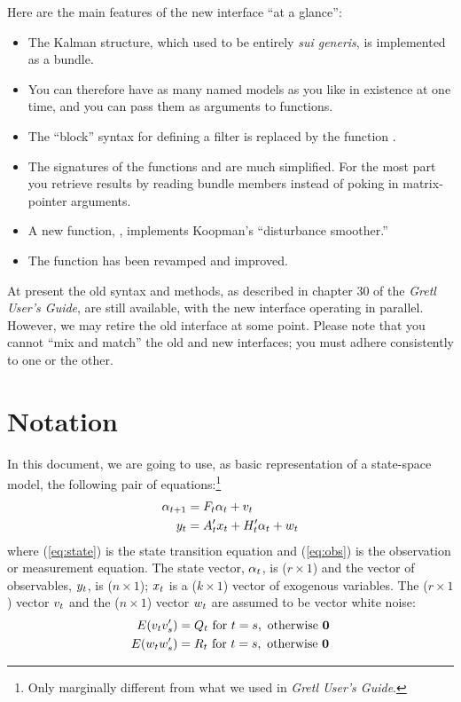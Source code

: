 \documentclass[a4paper]{article}
\begin{document}
Here are the main features of the new interface ``at a glance'':
%
\begin{itemize}
\item The Kalman structure, which used to be entirely \textit{sui
    generis}, is implemented as a bundle.
\item You can therefore have as many named models as you like in
  existence at one time, and you can pass them as arguments to
  functions.
\item The ``block'' syntax for defining a filter is replaced by the
  function .
\item The signatures of the functions  and 
  are much simplified. For the most part you retrieve results by
  reading bundle members instead of poking in matrix-pointer
  arguments.
\item A new function, , implements Koopman's
  ``disturbance smoother.''
\item The  function has been revamped and improved.
\end{itemize}

At present the old syntax and methods, as described in chapter 30 of
the \textit{Gretl User's Guide}, are still available, with the new
interface operating in parallel. However, we may retire the old
interface at some point. Please note that you cannot ``mix and match''
the old and new interfaces; you must adhere consistently to one or the
other.

\section{Notation}

In this document, we are going to use, as basic representation of
a state-space model, the following pair of equations:\footnote{Only
  marginally different from what we used in \textit{Gretl User's Guide}.}
%
\begin{align}
  \label{eq:state}
  \alpha_{t+1} &= F_t \alpha_t + v_t \\
  \label{eq:obs}
  y_t &= A_t'x_t + H_t' \alpha_t +
  w_t 
\end{align}
%
where (\ref{eq:state}) is the state transition equation and
(\ref{eq:obs}) is the observation or measurement equation.  The state
vector, $\alpha_{t}$, is ($r \times 1$) and the vector of
observables, $y_t$, is ($n \times 1$); $x_t$ is a ($k
\times 1$) vector of exogenous variables.  The ($r \times 1$) vector
$v_t$ and the ($n \times 1$) vector $w_t$ are assumed to
be vector white noise:
%
\begin{align*}
E(v_t v_s') &= Q_t \mbox{ for } t = s, 
    \mbox{ otherwise } \mathbf{0} \\
E(w_t w_s') &= R_t \mbox{ for } t = s, 
    \mbox{ otherwise } \mathbf{0}
\end{align*}
\end{document}
